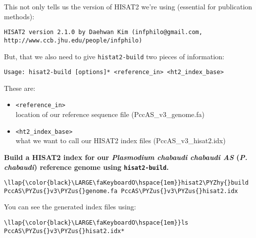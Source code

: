 \documentclass[11pt]{article}
\def\PYZus{\char`\_}
\def\PYZhy{\char`\-}
\begin{document}
    This not only tells us the version of HISAT2 we're using (essential for
publication methods):

\begin{verbatim}
HISAT2 version 2.1.0 by Daehwan Kim (infphilo@gmail.com, http://www.ccb.jhu.edu/people/infphilo)
\end{verbatim}

But, that we also need to give \texttt{histat2-build} two pieces of
information:

\begin{verbatim}
Usage: hisat2-build [options]* <reference_in> <ht2_index_base>
\end{verbatim}

These are:

\begin{itemize}
\item
  \texttt{\textless{}reference\_in\textgreater{}}~\\
  location of our reference sequence file (PccAS\_v3\_genome.fa)
\item
  \texttt{\textless{}ht2\_index\_base\textgreater{}}~\\
  what we want to call our HISAT2 index files (PccAS\_v3\_hisat2.idx)
\end{itemize}

    \textbf{Build a HISAT2 index for our \textit{Plasmodium chabaudi chabaudi
AS} (\textit{P. chabaudi}) reference genome using \texttt{hisat2-build}.}





\begin{terminalinput}
\begin{Verbatim}[commandchars=\\\{\}]
\llap{\color{black}\LARGE\faKeyboardO\hspace{1em}}hisat2\PYZhy{}build PccAS\PYZus{}v3\PYZus{}genome.fa PccAS\PYZus{}v3\PYZus{}hisat2.idx
\end{Verbatim}
\end{terminalinput}



    You can see the generated index files using:





\begin{terminalinput}
\begin{Verbatim}[commandchars=\\\{\}]
\llap{\color{black}\LARGE\faKeyboardO\hspace{1em}}ls PccAS\PYZus{}v3\PYZus{}hisat2.idx*
\end{Verbatim}
\end{terminalinput}
\end{document}
